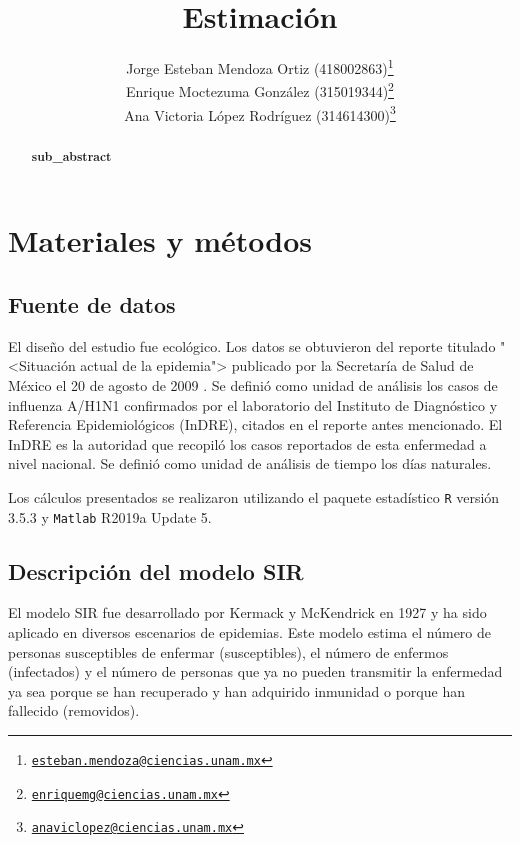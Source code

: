 \documentclass[12pt]{article}
\newcommand{\absdiv}[1]{%
  \par\addvspace{.5\baselineskip}%
  \noindent\textbf{#1}\quad\ignorespaces
}
\begin{document}
	\title{Estimación}
	\author{Jorge Esteban Mendoza Ortiz (418002863)\thanks{\href{mailto:esteban.mendoza@ciencias.unam.mx}{\nolinkurl{esteban.mendoza@ciencias.unam.mx}}} \\
	Enrique Moctezuma González (315019344)\thanks{\href{mailto:enriquemg@ciencias.unam.mx}{\nolinkurl{enriquemg@ciencias.unam.mx}}}\\
	Ana Victoria López Rodríguez (314614300)\thanks{\href{anaviclopez@ciencias.unam.mx}{\nolinkurl{anaviclopez@ciencias.unam.mx}}}}
	\date{}
	\maketitle
	
	\begin{abstract}
	\absdiv{sub\_abstract}
	\end{abstract}
	
	\noindent
	
	\section{Materiales y métodos}
	\subsection*{Fuente de datos}
	
	El diseño del estudio fue ecológico. Los datos se obtuvieron del reporte titulado "<Situación actual de la epidemia"> publicado por la Secretaría de Salud de México el 20 de agosto de 2009 \cite{Salud2009}. Se definió como unidad de análisis los casos de influenza A/H1N1 confirmados por el laboratorio del Instituto de Diagnóstico y Referencia Epidemiológicos (InDRE), citados en el reporte antes mencionado. El InDRE es la autoridad que recopiló los casos reportados de esta enfermedad a nivel nacional. Se definió como unidad de análisis de tiempo los días naturales.
	
	Los cálculos presentados se realizaron utilizando el paquete estadístico \texttt{R} versión 3.5.3 y \texttt{Matlab} R2019a Update 5.
	
	
	\subsection*{Descripción del modelo SIR}
	
	El modelo SIR fue desarrollado por Kermack y McKendrick en 1927 \cite{Bacaer2011} y ha sido aplicado en diversos escenarios de epidemias. Este modelo estima el número de personas susceptibles de enfermar (susceptibles), el número de enfermos (infectados) y el número de personas que ya no pueden transmitir la enfermedad ya sea porque se han recuperado y han adquirido inmunidad o porque han fallecido (removidos).
	
\end{document}
